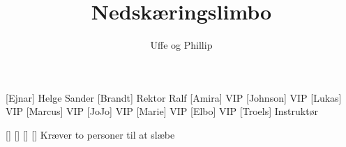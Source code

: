 \documentclass[a4paper,11pt]{article}
\title{Nedskæringslimbo}
\author{Uffe og Phillip}
\begin{document}
\maketitle

\begin{roles}
[Ejnar]  Helge Sander
[Brandt] Rektor Ralf
[Amira]  VIP
[Johnson]  VIP
[Lukas]  VIP
[Marcus]  VIP
[JoJo]  VIP
[Marie]  VIP
[Elbo]  VIP
[Troels] Instruktør
\end{roles}

\begin{props}
[]
[]
[]
[] Kræver to personer til at slæbe
\end{props}
\end{document}
